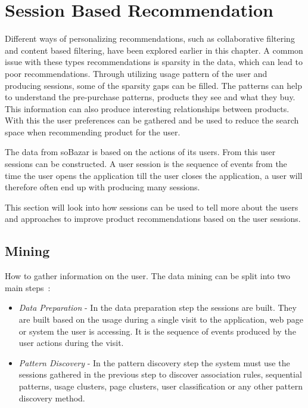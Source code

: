 
\section{Session Based Recommendation}
    Different ways of personalizing recommendations, such as collaborative filtering and content based filtering, have been explored earlier in this chapter.
    A common issue with these types recommendations is sparsity in the data, which can lead to poor recommendations.
    Through utilizing usage pattern of the user and producing sessions, some of the sparsity gaps can be filled.
    The patterns can help to understand the pre-purchase patterns, products they see and what they buy.
    This information can also produce interesting relationships between products.
    With this the user preferences can be gathered and be used to reduce the search space when recommending product for the user.

    The data from soBazar is based on the actions of its users.
    From this user sessions can be constructed.
    A user session is the sequence of events from the time the user opens the application till the user closes the application, a user will therefore often end up with producing many sessions.

    This section will look into how sessions can be used to tell more about the users and approaches to improve product recommendations based on the user sessions.



\subsection{Mining}
    How to gather information on the user.
    The data mining can be split into two main steps~\cite{Cho2002329}:
    \begin{itemize}
        \item \emph{Data Preparation} - In the data preparation step the sessions are built. They are built based on the usage during a single visit to the application, web page or system the user is accessing. It is the sequence of events produced by the user actions during the visit.
        \item \emph{Pattern Discovery} - In the pattern discovery step the system must use the sessions gathered in the previous step to discover association rules, sequential patterns, usage clusters, page clusters, user classification or any other pattern discovery method.
    \end{itemize}

